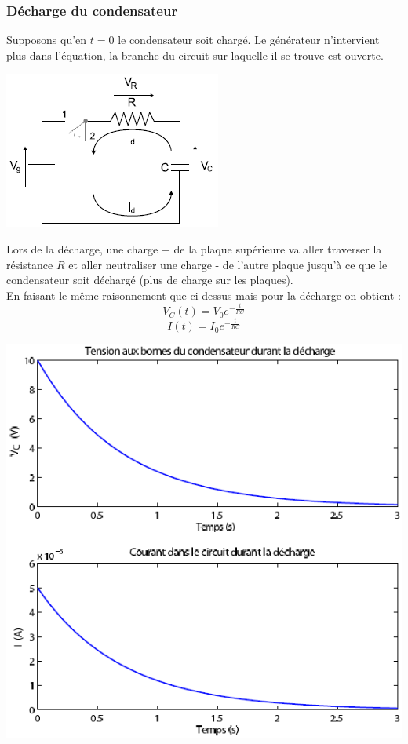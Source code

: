 \documentclass	[11pt, a4paper, openany]{book}
\begin{document}
\subsubsection*{Décharge du condensateur}
Supposons qu'en $t = 0$ le condensateur soit chargé. Le générateur n'intervient plus dans l'équation, la branche du circuit sur laquelle il se trouve est ouverte.
\begin{center}
\includegraphics[scale=0.5]{labo/image15.png}
\end{center}
Lors de la décharge, une charge + de la plaque supérieure va aller traverser la résistance $R$ et aller neutraliser une charge - de l'autre plaque jusqu'à ce que le condensateur soit déchargé (plus de charge sur les plaques).\\
En faisant le même raisonnement que ci-dessus mais pour la décharge on obtient : 
\begin{equation}
V_C(t) = V_0e^{-\frac{t}{RC}}
\end{equation}
\begin{equation}
I(t) = I_0e^{-\frac{t}{RC}}
\end{equation}
\begin{center}
\includegraphics[scale=0.5]{labo/image16.png}
\end{center}
\end{document}
